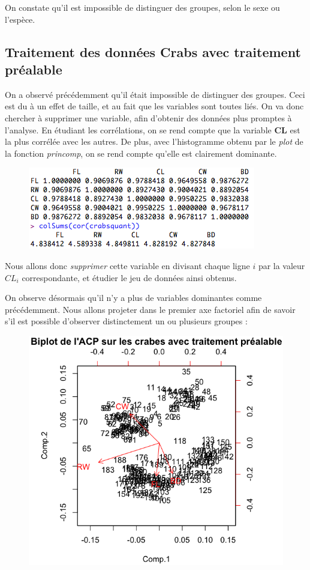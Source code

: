 \documentclass[a4paper,11pt]{article}
\begin{document}
\noindent On constate qu'il est impossible de distinguer des groupes, selon le sexe ou l'espèce. 

\subsection{Traitement des données Crabs avec traitement préalable}

\noindent On a observé précédemment qu'il était impossible de distinguer des groupes. Ceci est du à un effet de taille, et au fait que les variables sont toutes liés. On va donc chercher à supprimer une variable, afin d'obtenir des données plus promptes à l'analyse. En étudiant les corrélations, on se rend compte que la variable \textbf{CL} est la plus corrélée avec les autres. De plus, avec l'histogramme obtenu par le \textit{plot} de la fonction \textit{princomp}, on se rend compte qu'elle est clairement dominante. \\

\begin{figure}[H]
\begin{center}
\includegraphics[width=.6\textwidth]{img/sumcolcrabs.png}
\end{center}
\end{figure}

\noindent Nous allons donc \textit{supprimer} cette variable en divisant chaque ligne $i$ par la valeur $CL_i$ correspondante, et étudier le jeu de données ainsi obtenus.


\noindent On observe désormais qu'il n'y a plus de variables dominantes comme précédemment. Nous allons projeter dans le premier axe factoriel afin de savoir s'il est possible d'observer distinctement un ou plusieurs groupes : 

\begin{figure}[H]
\begin{center}
\includegraphics[width=.6\textwidth]{img/acpcrabscool1}
\end{center}
\end{figure}
\end{document}
